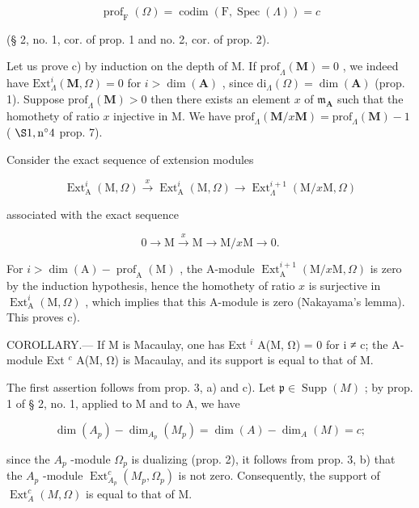 \[
\operatorname{prof} _ {\mathrm{F}} (\Omega) = \operatorname{codim} (\mathrm{F}, \operatorname{Spec} (\Lambda)) = c
\]

(§ 2, no. 1, cor. of prop. 1 and no. 2, cor. of prop. 2).

Let us prove c) by induction on the depth of M. If \(\mathrm{prof}_{\Lambda}(\mathbf{M}) = 0\) , we indeed have \(\mathrm{Ext}_{\Lambda}^{i}(\mathbf{M},\Omega) = 0\) for \(i > \dim (\mathbf{A})\) , since \(\mathrm{di}_{\Lambda}(\Omega) = \dim (\mathbf{A})\) (prop. 1). Suppose \(\mathrm{prof}_{\Lambda}(\mathbf{M}) > 0\) then there exists an element \(x\) of \(\mathfrak{m}_{\mathbf{A}}\) such that the homothety of ratio \(x\) injective in M. We have \(\mathrm{prof}_{\Lambda}(\mathbf{M} / x\mathbf{M}) = \mathrm{prof}_{\Lambda}(\mathbf{M}) - 1\) ( \(\S 1, \mathrm{n}^{\circ}4\) prop. 7).

Consider the exact sequence of extension modules

\[
\operatorname{Ext} _ {\mathrm{A}} ^ {i} (\mathrm{M}, \Omega) \xrightarrow {x} \operatorname{Ext} _ {\mathrm{A}} ^ {i} (\mathrm{M}, \Omega) \longrightarrow \operatorname{Ext} _ {\Lambda} ^ {i + 1} (\mathrm{M} / x \mathrm{M}, \Omega)
\]

associated with the exact sequence

\[
0 \to \mathrm{M} \xrightarrow {x} \mathrm{M} \longrightarrow \mathrm{M} / x \mathrm{M} \to 0.
\]

For \(i > \dim(\mathrm{A}) - \operatorname{prof}_{\mathrm{A}}(\mathrm{M})\) , the A-module \(\operatorname{Ext}_{\mathrm{A}}^{i+1}(\mathrm{M}/x\mathrm{M},\Omega)\) is zero by the induction hypothesis, hence the homothety of ratio \(x\) is surjective in \(\operatorname{Ext}_{\mathrm{A}}^{i}(\mathrm{M},\Omega)\) , which implies that this A-module is zero (Nakayama's lemma). This proves c).

COROLLARY.--- If M is Macaulay, one has Ext \(^{i}\) A(M, Ω) = 0 for i ≠ c; the A-module Ext \(^{c}\) A(M, Ω) is Macaulay, and its support is equal to that of M.

The first assertion follows from prop. 3, a) and c). Let \(\mathfrak{p} \in \operatorname{Supp}(M)\) ; by prop. 1 of § 2, no. 1, applied to M and to A, we have

\[
\dim (A _ {p}) - \dim_ {A _ {p}} (M _ {p}) = \dim (A) - \dim_ {A} (M) = c;
\]

since the \(A_{p}\) -module \(\Omega_{p}\) is dualizing (prop. 2), it follows from prop. 3, b) that the \(A_{p}\) -module \(\operatorname{Ext}_{A_{p}}^{c}(M_{p},\Omega_{p})\) is not zero. Consequently, the support of \(\operatorname{Ext}_{A}^{c}(M,\Omega)\) is equal to that of M.

